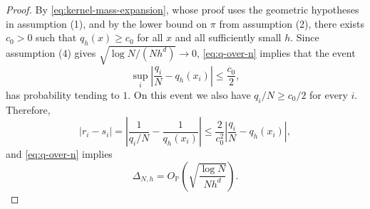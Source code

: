 \documentclass[a4paper,11pt, DIV=10]{scrartcl}
\numberwithin{equation}{section}
\theoremstyle{definition}
\theoremstyle{remark}
\begin{document}
\begin{proof}
By \eqref{eq:kernel-mass-expansion}, whose proof uses the geometric hypotheses in assumption \textup{(1)}, and by the lower bound on $\pi$ from assumption \textup{(2)}, there exists $c_0>0$ such that $q_h(x)\ge c_0$ for all $x$ and all sufficiently small $h$. Since assumption \textup{(4)} gives $\sqrt{\log N/(N h^d)}\to 0$, \eqref{eq:q-over-n} implies that the event
\begin{equation}
\sup_i\left|\frac{q_i}{N}-q_h(x_i)\right|\le \frac{c_0}{2},
\end{equation}
has probability tending to $1$. On this event we also have $q_i/N\ge c_0/2$ for every $i$. Therefore,
\begin{equation}
\left|r_i-s_i\right|
=
\left|
\frac{1}{q_i/N}-\frac{1}{q_h(x_i)}
\right|
\le
\frac{2}{c_0^2}
\left|
\frac{q_i}{N}-q_h(x_i)
\right|,
\end{equation}
and \eqref{eq:q-over-n} implies
\begin{equation}
\label{eq:reciprocal-rate}
\Delta_{N,h}
=
O_{\mathbb P}\!\left(\sqrt{\frac{\log N}{N h^d}}\right).
\end{equation}


\end{proof}
\end{document}

